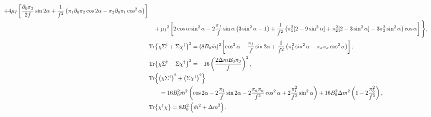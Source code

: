 \begin{align}
        + 4 \mu_I 
        \left[
            \frac{\partial_0 \pi_2}{2 f} \sin{2\alpha}
            + \frac{1}{f^2}
            \left(
                \pi_1 \partial_0 \pi_2 \cos{2\alpha}
                - \pi_2 \partial_0 \pi_1\cos^2{\alpha}
            \right)
        \right]\\\notag
        & \quad + \mu_I{}^2
        \left[
            2\cos{\alpha}\sin^2{\alpha} 
            - 2 \frac{\pi_1}{f} \sin{\alpha}
            \left(3\sin^2{\alpha} - 1\right)
            + \frac{1}{f^2}
            \left(                
                \pi_1^2[2 - 9 \sin^2{\alpha}]
                + \pi_2^2 [2 - 3 \sin^2{\alpha}]
                - 3\pi_3^2\sin^2{\alpha}
            \right)
            \cos{\alpha}
        \right]
    \Bigg\}, \\
    \label{l3}
    & \Tr{\chi \Sigma^\dagger + \Sigma \chi^\dagger }^2
    = (8 B_0 \bar m)^2 
    \left[
        \cos^2{\alpha} 
        - \frac{\pi_1}{f} \sin{2\alpha}
        + \frac{1}{f^2}\left(\pi_1^2 \sin^2{\alpha} - \pi_a \pi_a \cos^2{\alpha}\right)
    \right], \\
    \label{l7}
    & \Tr{\chi \Sigma^\dagger - \Sigma \chi^\dagger }^2
     = - 16 \left( \frac{2 \Delta m B_0 \pi_3}{f} \right)^2, \\
    \notag
    & \Tr{\left(\chi \Sigma^\dagger\right)^2 + \left(\Sigma \chi^\dagger \right)^2}
    \\\label{h3}
    & \quad \quad = 16 B_0^2 \bar m^2
    \left(
        \cos{2\alpha} 
        - 2\frac{\pi_1}{f} \sin{2\alpha}
        - 2\frac{\pi_a \pi_a}{f^2} \cos^2{\alpha}
        + 2\frac{\pi_1^2}{f^2} \sin^2{\alpha}
    \right)
    + 16 B_0^2 \Delta m^2
    \left(
        1- 2\frac{ \pi_3^2}{f^2}
    \right)
    , \\
    \label{h2}
    & \Tr{\chi^\dagger \chi} = 8B_0^2\left( {\bar m}^2 + {\Delta m}^2\right).
\end{align}

\endgroup

